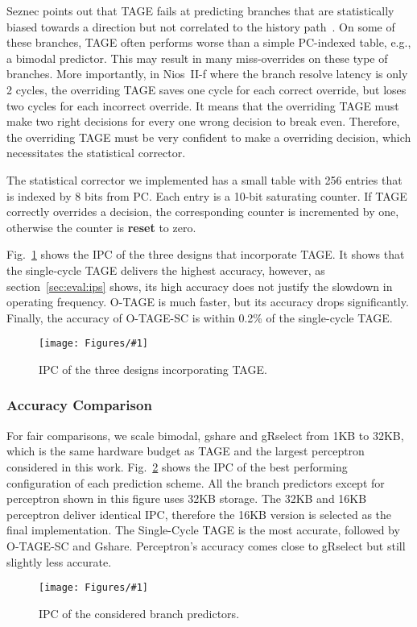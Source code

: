 \documentclass[conference]{IEEEtran}
\newcommand{\kfig}[4]{ %
        \begin{figure}[!t]
        \centering
        \texttt{[image: Figures/\#1]}
        \vspace{-1mm}
        \caption{#3}
        \label{#2}
        \end{figure}
}
\begin{document}
Seznec points out that TAGE fails at predicting branches that are statistically biased towards a direction but not correlated to the history path~\cite{isltage}. On some of these branches, TAGE often performs worse than a simple PC-indexed table, e.g., a bimodal predictor. This may result in many miss-overrides on these type of branches. More importantly, in Nios~II-f where the branch resolve latency is only 2 cycles, the overriding TAGE saves one cycle for each correct override, but loses two cycles for each incorrect override. It means that the overriding TAGE must make two right decisions for every one wrong decision to break even. Therefore, the overriding TAGE must be very confident to make a overriding decision, which necessitates the statistical corrector.

The statistical corrector we implemented has a small table with 256 entries that is indexed by 8 bits from PC. Each entry is a 10-bit saturating counter. If TAGE correctly overrides a decision, the corresponding counter is incremented by one, otherwise the counter is \textbf{reset} to zero.

Fig.~\ref{fig:tageIPC} shows the IPC of the three designs that incorporate TAGE. It shows that the single-cycle TAGE delivers the highest accuracy, however, as section~\ref{sec:eval:ips} shows, its high accuracy does not justify the slowdown in operating frequency. O-TAGE is much faster, but its accuracy drops significantly. Finally, the accuracy of O-TAGE-SC is within 0.2\% of the single-cycle TAGE.
\kfig{tageIPC.pdf}{fig:tageIPC}{IPC of the three designs incorporating TAGE.}{angle = 0, trim = 1.1in 1.5in 0.9in 1.5in, clip, width=0.4\textwidth}


\subsubsection{Accuracy Comparison}
\label{sec:eval:ipc:comparison}
For fair comparisons, we scale bimodal, gshare and gRselect from 1KB to 32KB, which is the same hardware budget as TAGE and the largest perceptron considered in this work. Fig.~\ref{fig:adipc} shows the IPC of the best performing configuration of each prediction scheme. All the branch predictors except for perceptron shown in this figure uses 32KB storage. The 32KB and 16KB perceptron deliver identical IPC, therefore the 16KB version is selected as the final implementation. The Single-Cycle TAGE is the most accurate, followed by O-TAGE-SC and Gshare. Perceptron's accuracy comes close to gRselect but still slightly less accurate.
\kfig{adipc.pdf}{fig:adipc}{IPC of the considered branch predictors.}{angle = 0, trim = 0.9in 2.3in 0.9in 2.3in, clip, width=0.4\textwidth}
\end{document}

